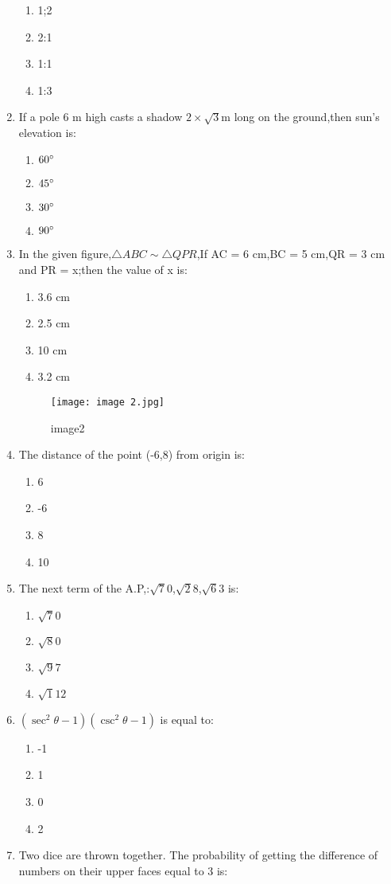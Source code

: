 \documentclass{article}
\begin{document}
\begin{enumerate}
	\begin{enumerate}
	\item 1;2
	\item 2:1
	\item 1:1
	\item 1:3
\end{enumerate}
\item If a pole 6 m high casts a shadow $2 \times \sqrt{3}$m long on the ground,then sun's elevation is:
	\begin{enumerate}
	\item $60\degree$
	\item $45\degree$
	\item $30\degree$
	\item $90\degree$
	\end{enumerate}
\item In the given figure,\(\triangle ABC \sim \triangle QPR\),If AC = 6 cm,BC = 5 cm,QR = 3 cm and PR = x;then the value of  x is:
	\begin{enumerate}
	\item 3.6 cm
	\item 2.5 cm
	\item 10 cm
	\item 3.2 cm
\end{enumerate}
\begin{figure}[h!]
\centering
\texttt{[image: image 2.jpg]}
\label{fig:image1}
	\caption{image2}
\end{figure}
\item The distance of the point (-6,8) from origin is:
	\begin{enumerate}
	\item 6
	\item -6
	\item 8
	\item 10
\end{enumerate}
\item The next term of the A.P,:$\sqrt 70$,$\sqrt 28$,$\sqrt 63$ is:
	\begin{enumerate}
        \item $\sqrt 70$
	\item $\sqrt 80$
	\item $\sqrt 97$
	\item $\sqrt 112$
\end{enumerate}
\newpage
\item \((\sec^2 \theta - 1)(\csc^2 \theta - 1)\) 
is equal to:
\begin{enumerate}
	\item -1
	\item 1
	\item 0
	\item 2
\end{enumerate}
\item  Two dice are thrown together. The probability of getting the difference of numbers on their upper faces equal to 3 is:


\end{enumerate}
\end{document}
